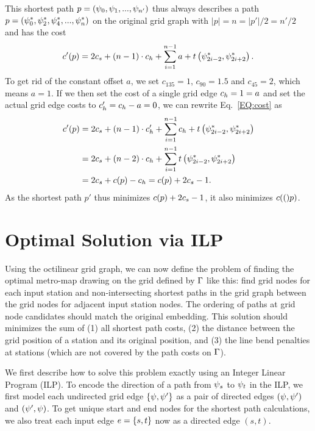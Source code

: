 \documentclass{sig-alternate-sigmod09}
\begin{document}
This shortest path $p = (\psi_0, \psi_1, ..., \psi_{n'})$ thus always describes a path $p = (\psi^*_0, \psi^*_2, \psi^*_4, ..., \psi^*_{n})$ on the original grid graph with $|p| = n = |p'| / 2 = n' / 2$ and has the cost
%
\begin{align}
	c'(p) = 2 c_s + \left(n - 1\right) \cdot c_h + \sum_{i=1}^{n - 1} a + t\left(\psi^*_{2i - 2}, \psi^*_{2i+2}\right)\label{EQ:cost}.
\end{align}
%
To get rid of the constant offset $a$, we set $c_{135} = 1$, $c_{90} = 1.5$ and $c_{45} = 2$, which means $a = 1$.
If we then set the cost of a single grid edge $c_h = 1 = a$ and set the actual grid edge costs to $c'_h = c_h - a = 0$, we can rewrite Eq.~\ref{EQ:cost} as  
%
\begin{align}
	c'(p) &= 2 c_s +  \left(n - 1\right) \cdot c'_h + \sum_{i=1}^{n - 1} c_h + t\left(\psi^*_{2i - 2}, \psi^*_{2i+2}\right) \\
	     &= 2 c_s + \left(n - 2\right) \cdot c_h + \sum_{i=1}^{n - 1} t \left(\psi^*_{2i - 2}, \psi^*_{2i+2}\right) \\
	     &= 2 c_s + c(p) - c_h = c(p) + 2 c_s - 1.
\end{align}
%
As the shortest path $p'$ thus minimizes $c(p) + 2 c_s - 1$, it also minimizes $c(()p)$.

\section{Optimal Solution via ILP}

Using the octilinear grid graph, we can now define the problem of finding the optimal metro-map drawing on the grid defined by $\Gamma$ like this: find grid nodes for each input station and non-intersecting shortest paths in the grid graph between the grid nodes for adjacent input station nodes.
The ordering of paths at grid node candidates should match the original embedding.
This solution should minimizes the sum of (1) all shortest path costs, (2) the distance between the grid position of a station and its original position, and (3) the line bend penalties at stations (which are not covered by the path costs on $\Gamma$).

We first describe how to solve this problem exactly using an Integer Linear Program (ILP).
To encode the direction of a path from $\psi_s$ to $\psi_t$ in the ILP, we first model each undirected grid edge $\{\psi, \psi'\}$ as a pair of directed edges $(\psi, \psi')$ and $(\psi', \psi)$.
To get unique start and end nodes for the shortest path calculations, we also treat each input edge $e = \{s, t\}$ now as a directed edge $(s, t)$.
\end{document}
